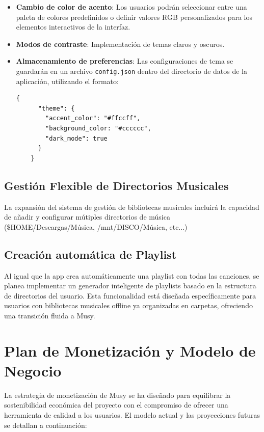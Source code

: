 \documentclass[11pt, a4paper]{article}
\begin{document}
  \begin{itemize}
    \item \textbf{Cambio de color de acento}: Los usuarios podrán seleccionar entre una paleta de colores predefinidos o definir valores RGB personalizados para los elementos interactivos de la interfaz.

    \item \textbf{Modos de contraste}: Implementación de temas claros y oscuros.

    \item \textbf{Almacenamiento de preferencias}: Las configuraciones de tema se guardarán en un archivo \verb|config.json| dentro del directorio de datos de la aplicación, utilizando el formato:

    \begin{lstlisting}[caption={config.json}]
    {
      "theme": {
        "accent_color": "#ffccff",
        "background_color: "#cccccc",
        "dark_mode": true
      }
    }
    \end{lstlisting}

  \end{itemize}

  \subsection{Gestión Flexible de Directorios Musicales}

  La expansión del sistema de gestión de bibliotecas musicales incluirá la capacidad de añadir y configurar mútiples directorios de música (\$HOME/Descargas/Música, /mnt/DISCO/Música, etc...)

  \subsection{Creación automática de Playlist}

  Al igual que la app crea automáticamente una playlist con todas las canciones, se planea implementar un generador inteligente de playlists basado en la estructura de directorios del usuario. Esta funcionalidad está diseñada específicamente para usuarios con bibliotecas musicales offline ya organizadas en carpetas, ofreciendo una transición fluida a Musy.

\section{Plan de Monetización y Modelo de Negocio}

La estrategia de monetización de Musy se ha diseñado para equilibrar la sostenibilidad económica del proyecto con el compromiso de ofrecer una herramienta de calidad a los usuarios. El modelo actual y las proyecciones futuras se detallan a continuación:
\end{document}
